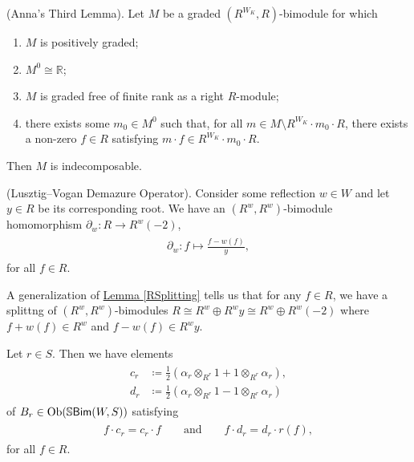 \noindent\begin{lemma}\textup{(Anna's Third Lemma).}\label{Anna3} Let $M$ be a graded $(R^{W_K}, R)$-bimodule for which
\begin{enumerate}[label=\textup{(\roman*).}, ref=\textup{(\roman*)}, leftmargin=4\parindent]
\item $M$ is positively graded;
\item $M^0 \cong \mathbb{R}$;
\item $M$ is graded free of finite rank as a right $R$-module;
\item there exists some $m_0 \in M^0$ such that, for all $m \in M\setminus R^{W_K}\cdot m_0\cdot R$, there exists a non-zero $f \in R$ satisfying $m\cdot f \in R^{W_K}\cdot m_0\cdot R$.
\end{enumerate}
\noindent Then $M$ is indecomposable.\\
\end{lemma}

\noindent\begin{proposition}\textup{(Lusztig--Vogan Demazure Operator).} Consider some reflection $w \in W$ and let $y \in R$ be its corresponding root. We have an $(R^w, R^w)$-bimodule homomorphism $\partial_w : R \to R^w(-2)$,
\begin{align*}
\begin{split}
\partial_w : f \mapsto \frac{f - w(f)}{y},
\end{split}
\end{align*}
\noindent for all $f \in R$.\\
\end{proposition}

\noindent\begin{remark} A generalization of \hyperref[RSplitting]{Lemma \ref*{RSplitting}} tells us that for any $f \in R$, we have a splittng of $(R^w, R^w)$-bimodules $R \cong R^w \oplus R^wy \cong R^w \oplus R^w(-2)$ where $f + w(f) \in R^w$ and $f - w(f) \in R^wy$.\\
\end{remark}

\noindent\begin{proposition} Let $r \in S$. Then we have elements
\begin{align*}
\begin{split}
c_r &\coloneqq \frac{1}{2}(\alpha_r \otimes_{R^r} 1 + 1 \otimes_{R^r} \alpha_r),\\
d_r &\coloneqq \frac{1}{2}(\alpha_r \otimes_{R^r} 1 - 1 \otimes_{R^r} \alpha_r)
\end{split}
\end{align*}
\noindent of $B_r \in \textnormal{Ob}(\mathbb{S}\textnormal{\textsf{Bim}}(W, S))$ satisfying
\begin{align*}
\begin{split}
f\cdot c_r = c_r \cdot f\qquad\text{and}\qquad f\cdot d_r = d_r\cdot r(f),
\end{split}
\end{align*}
\noindent for all $f \in R$.\\
\end{proposition}

